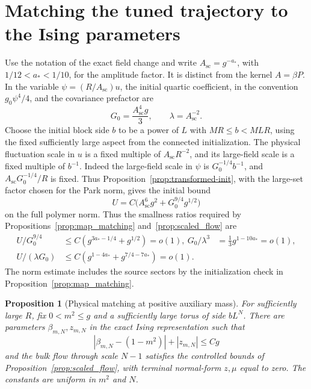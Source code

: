 \documentclass[11pt]{article}
\newtheorem{proposition}{Proposition}[section]
\begin{document}
\section{Matching the tuned trajectory to the Ising parameters}
\label{sec:matching-physical}

Use the notation of the exact field change and write
\(A_{\mathrm{sc}}=g^{-a_*}\), with
\(1/12<a_*<1/10\), for the amplitude factor. It is distinct
from the kernel \(A=\beta P\). In the variable
\(\psi=(R/A_{\mathrm{sc}})u\), the initial quartic coefficient,
in the convention \(g_0\psi^4/4\), and the covariance prefactor are
\[
 G_0=\frac{A_{\mathrm{sc}}^4g}{3},\qquad
 \lambda=A_{\mathrm{sc}}^{-2}.
\]
Choose the initial block side \(b\) to be a power of \(L\) with
\(M R\le b<MLR\), using the fixed sufficiently large aspect
from the connected initialization. The physical fluctuation
scale in \(u\) is a fixed multiple of \(A_{\mathrm{sc}} R^{-2}\),
and its large-field scale is a fixed multiple of \(b^{-1}\).
Indeed the large-field scale in \(\psi\) is
\(G_0^{-1/4}b^{-1}\), and
\(A_{\mathrm{sc}}G_0^{-1/4}/R\) is fixed.
Thus Proposition~\ref{prop:transformed-init}, with the large-set
factor chosen for the Park norm, gives the initial bound
\[
 U=C\big(A_{\mathrm{sc}}^6g^2+G_0^{9/4}g^{1/2}\big)
\]
on the full polymer norm. Thus the smallness ratios required by
Propositions~\ref{prop:map_matching} and~\ref{prop:scaled_flow} are
\begin{align*}
 U/G_0^{9/4}
    &\le C(g^{3a_*-1/4}+g^{1/2})=o(1),\
 G_0/\lambda^3&=\tfrac13g^{1-10a_*}=o(1),\\
 U/(\lambda G_0)&\le C(g^{1-4a_*}+g^{7/4-7a_*})=o(1).
\end{align*}
The norm estimate includes the source sectors by the initialization
check in Proposition~\ref{prop:map_matching}.

\begin{proposition}[Physical matching at positive auxiliary mass]
\label{prop:physical-matching}
For sufficiently large \(R\), fix \(0<m^2\le g\) and a sufficiently
large torus of side \(bL^N\). There are parameters
\(\beta_{m,N},z_{m,N}\) in the exact Ising representation such that
\[
 |\beta_{m,N}-(1-m^2)|+|z_{m,N}|\le Cg
\]
and the bulk flow through scale \(N-1\) satisfies the controlled
bounds of Proposition~\ref{prop:scaled_flow}, with terminal
normal-form \(z,\mu\) equal to zero. The constants are uniform
in \(m^2\) and \(N\).
\end{proposition}
\end{document}
